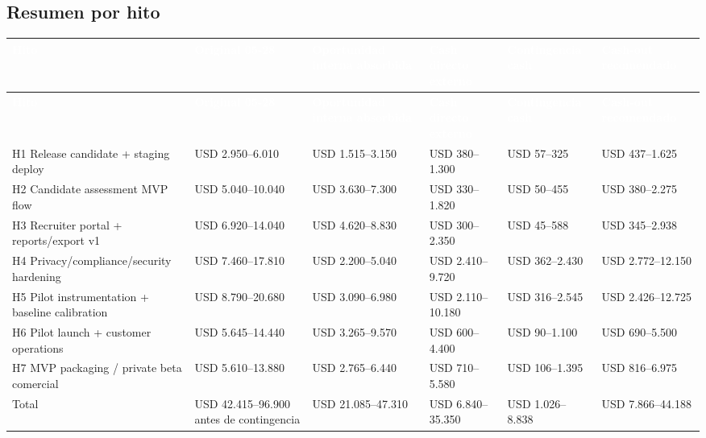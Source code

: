 \documentclass[11pt,a4paper]{article}
\begin{document}
\clearpage
\begin{landscape}
\section{Resumen por hito}
\small
\begin{longtable}{@{}p{5.2cm}p{3.2cm}p{3.4cm}p{3.2cm}p{3.0cm}p{3.3cm}@{}}
\toprule
\rowcolor{KDark}\textcolor{white}{\textbf{Hito}} & \textcolor{white}{\textbf{Original 05-28}} & \textcolor{white}{\textbf{Oportunidad interna absorbida}} & \textcolor{white}{\textbf{Cash directo externo}} & \textcolor{white}{\textbf{Contingencia cash}} & \textcolor{white}{\textbf{Cash-out recomendado}} \\
\midrule
\endfirsthead
\toprule
\rowcolor{KDark}\textcolor{white}{\textbf{Hito}} & \textcolor{white}{\textbf{Original 05-28}} & \textcolor{white}{\textbf{Oportunidad interna absorbida}} & \textcolor{white}{\textbf{Cash directo externo}} & \textcolor{white}{\textbf{Contingencia cash}} & \textcolor{white}{\textbf{Cash-out recomendado}} \\
\midrule
\endhead
H1 Release candidate + staging deploy & USD 2.950--6.010 & USD 1.515--3.150 & USD 380--1.300 & USD 57--325 & USD 437--1.625 \\
H2 Candidate assessment MVP flow & USD 5.040--10.040 & USD 3.630--7.300 & USD 330--1.820 & USD 50--455 & USD 380--2.275 \\
H3 Recruiter portal + reports/export v1 & USD 6.920--14.040 & USD 4.620--8.830 & USD 300--2.350 & USD 45--588 & USD 345--2.938 \\
H4 Privacy/compliance/security hardening & USD 7.460--17.810 & USD 2.200--5.040 & USD 2.410--9.720 & USD 362--2.430 & USD 2.772--12.150 \\
H5 Pilot instrumentation + baseline calibration & USD 8.790--20.680 & USD 3.090--6.980 & USD 2.110--10.180 & USD 316--2.545 & USD 2.426--12.725 \\
H6 Pilot launch + customer operations & USD 5.645--14.440 & USD 3.265--9.570 & USD 600--4.400 & USD 90--1.100 & USD 690--5.500 \\
H7 MVP packaging / private beta comercial & USD 5.610--13.880 & USD 2.765--6.440 & USD 710--5.580 & USD 106--1.395 & USD 816--6.975 \\
Total & USD 42.415--96.900 antes de contingencia & USD 21.085--47.310 & USD 6.840--35.350 & USD 1.026--8.838 & USD 7.866--44.188 \\

\bottomrule
\end{longtable}
\normalsize
\end{landscape}
\clearpage
\end{document}

